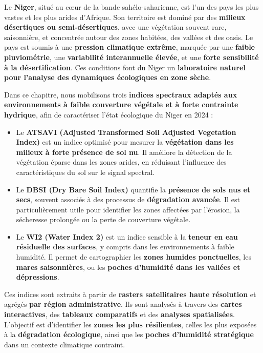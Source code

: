 \documentclass[
]{book}
\begin{document}
Le \textbf{Niger}, situé au cœur de la bande sahélo-saharienne, est l'un des pays les plus vastes et les plus arides d'Afrique. Son territoire est dominé par des \textbf{milieux désertiques ou semi-désertiques}, avec une végétation souvent rare, saisonnière, et concentrée autour des zones habitées, des vallées et des oasis. Le pays est soumis à une \textbf{pression climatique extrême}, marquée par une \textbf{faible pluviométrie}, une \textbf{variabilité interannuelle élevée}, et une \textbf{forte sensibilité à la désertification}. Ces conditions font du Niger un \textbf{laboratoire naturel pour l'analyse des dynamiques écologiques en zone sèche}.

Dans ce chapitre, nous mobilisons trois \textbf{indices spectraux adaptés aux environnements à faible couverture végétale et à forte contrainte hydrique}, afin de caractériser l'état écologique du Niger en 2024 :

\begin{itemize}
\item
  Le \textbf{ATSAVI (Adjusted Transformed Soil Adjusted Vegetation Index)} est un indice optimisé pour mesurer la \textbf{végétation dans les milieux à forte présence de sol nu}. Il améliore la détection de la végétation éparse dans les zones arides, en réduisant l'influence des caractéristiques du sol sur le signal spectral.
\item
  Le \textbf{DBSI (Dry Bare Soil Index)} quantifie la \textbf{présence de sols nus et secs}, souvent associés à des processus de \textbf{dégradation avancée}. Il est particulièrement utile pour identifier les zones affectées par l'érosion, la sécheresse prolongée ou la perte de couverture végétale.
\item
  Le \textbf{WI2 (Water Index 2)} est un indice sensible à la \textbf{teneur en eau résiduelle des surfaces}, y compris dans les environnements à faible humidité. Il permet de cartographier les \textbf{zones humides ponctuelles}, les \textbf{mares saisonnières}, ou les \textbf{poches d'humidité dans les vallées et dépressions}.
\end{itemize}

Ces indices sont extraits à partir de \textbf{rasters satellitaires haute résolution} et agrégés \textbf{par région administrative}. Ils sont analysés à travers des \textbf{cartes interactives}, des \textbf{tableaux comparatifs} et des \textbf{analyses spatialisées}. L'objectif est d'identifier les \textbf{zones les plus résilientes}, celles les plus exposées à la \textbf{dégradation écologique}, ainsi que les \textbf{poches d'humidité stratégique} dans un contexte climatique contraint.
\end{document}
